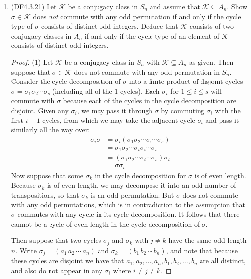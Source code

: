 \documentclass[11pt]{article}
\begin{document}
\begin{enumerate}
    \item (DF4.3.21) Let $\mathcal{K}$ be a conjugacy class in $S_n$ and assume that $\mathcal{K}\subseteq A_n$. Show $\sigma\in \mathcal{K}$ does \textit{not} commute with any odd permutation if and only if the cycle type of $\sigma$ consists of distinct odd integers. Deduce that $\mathcal{K}$ consists of two conjugacy classes in $A_n$ if and only if the cycle type of an element of $\mathcal{K}$ consists of distinct odd integers.
    \begin{proof}
      (1) Let $\mathcal{K}$ be a conjugacy class in $S_n$ with $\mathcal{K}\subseteq A_n$ as given. Then suppose that $\sigma\in \mathcal{K}$ does not commute with any odd permutation in $S_n$. Consider the cycle decomposition of $\sigma$ into a finite product of disjoint cycles $ \sigma = \sigma_1 \sigma_2 \cdots \sigma_s$ (including all of the $1$-cycles). Each $\sigma_i$ for $1\leq i \leq s$ will commute with $\sigma$ because each of the cycles in the cycle decomposition are disjoint. Given any $\sigma_i$, we may pass it through $\sigma$ by commuting $\sigma_i$ with the first $i-1$ cycles, from which we may take the adjacent cycle $\sigma_i$ and pass it similarly all the way over: \begin{align*}
        \sigma_i  \sigma &= \sigma_i  (\sigma_1 \sigma_2 \cdots \sigma_i \cdots \sigma_s)\\
        &= \sigma_1 \sigma_2 \cdots \sigma_i \sigma_i \cdots \sigma_s\\
        &= (\sigma_1 \sigma_2 \cdots \sigma_i \cdots \sigma_s) \sigma_i\\
        &= \sigma \sigma_i
      \end{align*}
      Now suppose that some $\sigma_k$ in the cycle decomposition for $\sigma$ is of even length. Because $\sigma_k$ is of even length, we may decompose it into an odd number of transpositions, so that $\sigma_k$ is an odd permutation. But $\sigma$ does not commute with any odd permutations, which is in contradiction to the assumption that $\sigma$ commutes with any cycle in its cycle decomposition. It follows that there cannot be a cycle of even length in the cycle decomposition of $\sigma$.

      Then suppose that two cycles $\sigma_j$ and $\sigma_k$ with $j\neq k$ have the same odd length $n$. Write $\sigma_j = (a_{1}\, a_{2} \, \cdots\, a_{n})$ and $\sigma_k = (b_{1}\, b_{2} \, \cdots\, b_{n})$, and note that because these cycles are disjoint we have that $a_1,a_2,\dots, a_n,b_1,b_2,\dots,b_n$ are all distinct, and also do not appear in any $\sigma_i$ where $i\neq j \neq k$.


\end{proof}
\end{enumerate}
\end{document}
